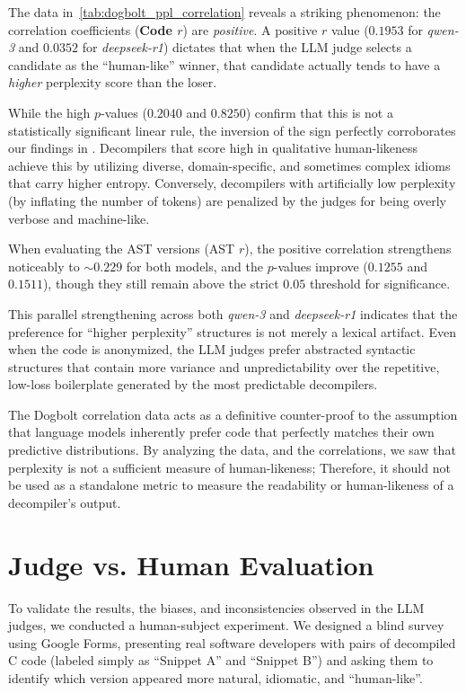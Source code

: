 The data in~\vref{tab:dogbolt_ppl_correlation} reveals a striking phenomenon: the correlation coefficients (\textbf{Code $r$}) are \textit{positive}. A positive $r$ value ($0.1953$ for \emph{qwen-3} and $0.0352$ for \emph{deepseek-r1}) dictates that when the \ac{LLM} judge selects a candidate as the ``human-like'' winner, that candidate actually tends to have a \textit{higher} perplexity score than the loser. 

While the high $p$-values ($0.2040$ and $0.8250$) confirm that this is not a statistically significant linear rule, the inversion of the sign perfectly corroborates our findings in . Decompilers that score high in qualitative human-likeness achieve this by utilizing diverse, domain-specific, and sometimes complex idioms that carry higher entropy. 
Conversely, decompilers with artificially low perplexity (by inflating the number of tokens) are penalized by the judges for being overly verbose and machine-like. 

When evaluating the \ac{AST} versions (AST $r$), the positive correlation strengthens noticeably to $\sim 0.229$ for both models, and the $p$-values improve ($0.1255$ and $0.1511$), though they still remain above the strict $0.05$ threshold for significance. 

This parallel strengthening across both \emph{qwen-3} and \emph{deepseek-r1} indicates that the preference for ``higher perplexity'' structures is not merely a lexical artifact. Even when the code is anonymized, the \ac{LLM} judges prefer abstracted syntactic structures that contain more variance and unpredictability over the repetitive, low-loss boilerplate generated by the most predictable decompilers.

The Dogbolt correlation data acts as a definitive counter-proof to the assumption that language models inherently prefer code that perfectly matches their own predictive distributions.
By analyzing the data, and the correlations, we saw that perplexity is not a sufficient measure of human-likeness;
Therefore, it should not be used as a standalone metric to measure the readability or human-likeness of a decompiler's output.

\section{Judge vs. Human Evaluation}

To validate the results, the biases, and inconsistencies observed in the \ac{LLM} judges, we conducted a human-subject experiment. We designed a blind survey using Google Forms, presenting real software developers with pairs of decompiled C code (labeled simply as ``Snippet A'' and ``Snippet B'') and asking them to identify which version appeared more natural, idiomatic, and ``human-like''.

